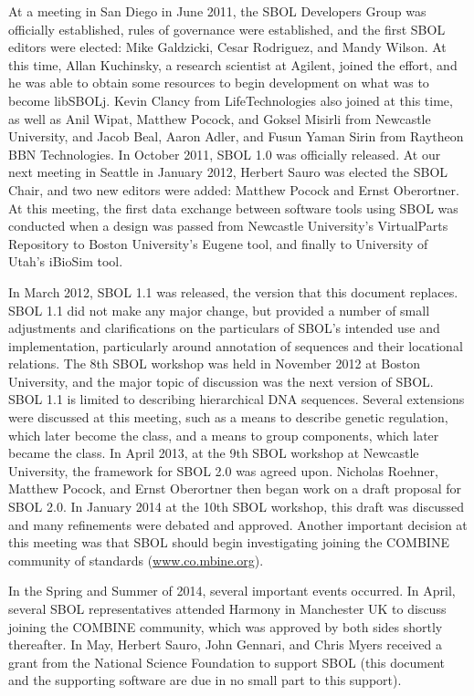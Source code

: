 At a meeting in San Diego in June 2011, the SBOL Developers Group was officially established, rules of governance were established, and the first SBOL editors were elected: Mike Galdzicki, Cesar Rodriguez, and Mandy Wilson.  
At this time, Allan Kuchinsky, a research scientist at Agilent, joined the effort, and he was able to obtain some resources to begin development on what was to become libSBOLj.  
Kevin Clancy from LifeTechnologies also joined at this time, as well as Anil Wipat, Matthew Pocock, and Goksel Misirli from Newcastle University, and Jacob Beal, Aaron Adler, and Fusun Yaman Sirin from Raytheon BBN Technologies.  
In October 2011, SBOL 1.0 was officially released.  At our next meeting in Seattle in January 2012, Herbert Sauro was elected the SBOL Chair, and two new editors were added: Matthew Pocock and Ernst Oberortner.  
At this meeting, the first data exchange between software tools using SBOL was conducted when a design was passed from Newcastle University's VirtualParts Repository to Boston University's Eugene tool, and finally to University of Utah's iBioSim tool. 

In March 2012, SBOL 1.1 was released, the version that this document replaces. 
SBOL 1.1 did not make any major change, but provided a number of small adjustments and clarifications on the particulars of SBOL's intended use and implementation, particularly around annotation of sequences and their locational relations.
The 8th SBOL workshop was held in November 2012 at Boston University, and the major topic of discussion was the next version of SBOL.  SBOL 1.1 is limited to describing hierarchical DNA sequences.  
Several extensions were discussed at this meeting, such as a means to describe genetic regulation, which later become the  class, and a means to group components, which later became the  class.  
In April 2013, at the 9th SBOL workshop at Newcastle University, the framework for SBOL 2.0 was agreed upon.  
Nicholas Roehner, Matthew Pocock, and Ernst Oberortner then began work on a draft proposal for SBOL 2.0.  In January 2014 at the 10th SBOL workshop, this draft was discussed and many refinements were debated and approved.  Another important decision at this meeting was that SBOL should begin investigating joining the COMBINE community of standards (\url{www.co.mbine.org}). 

In the Spring and Summer of 2014, several important events occurred.  In April, several SBOL representatives attended Harmony in Manchester UK to discuss joining the COMBINE community, which was approved by both sides shortly thereafter.  In May, Herbert Sauro, John Gennari, and Chris Myers received a grant from the National Science Foundation to support SBOL (this document and the supporting software are due in no small part to this support).  

